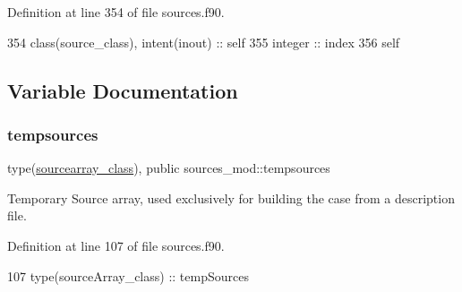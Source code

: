 Definition at line 354 of file sources.\+f90.


\begin{DoxyCode}
354     \textcolor{keywordtype}{class}(source\_class), \textcolor{keywordtype}{intent(inout)} :: self
355     \textcolor{keywordtype}{integer} :: index
356     self%
\end{DoxyCode}


\subsection{Variable Documentation}
\mbox{\label{namespacesources__mod_adafecf0cf9ade0b7a85421a5801a920e}} 
\subsubsection{\texorpdfstring{tempsources}{tempsources}}
{\footnotesize\ttfamily type(\mbox{\hyperlink{structsources__mod_1_1sourcearray__class}{sourcearray\+\_\+class}}), public sources\+\_\+mod\+::tempsources}



Temporary Source array, used exclusively for building the case from a description file. 



Definition at line 107 of file sources.\+f90.


\begin{DoxyCode}
107     \textcolor{keywordtype}{type}(sourceArray\_class) :: tempSources
\end{DoxyCode}
